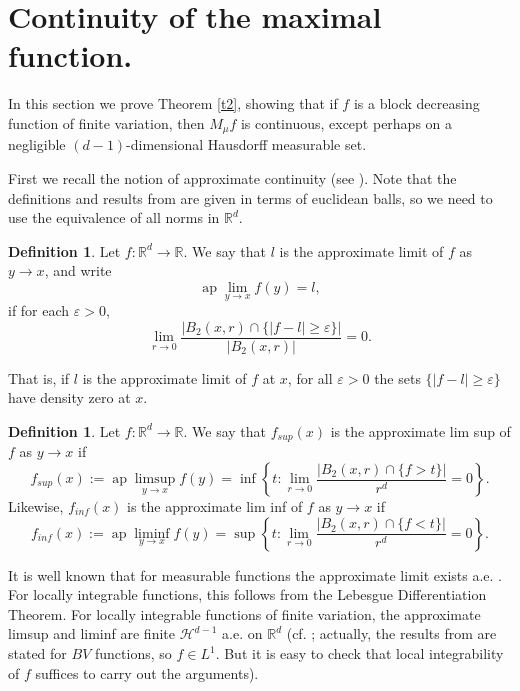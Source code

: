 \documentclass[12pt]{amsart}
\numberwithin{equation}{section}
\theoremstyle{plain}
\theoremstyle{definition}
\newtheorem{definition}[theorem]{Definition}
\theoremstyle{remark}
\begin{document}
\section{Continuity of the maximal function.}

In this section we prove Theorem \ref{t2},
showing that if $f$ is a
 block decreasing function of  finite variation, then
 $M_\mu f$ is continuous, except perhaps on a negligible $(d-1)$-dimensional
Hausdorff measurable set.

First we recall the notion of
approximate continuity (see \cite[p. 47 and 209]{EvGa}). Note that
the definitions and results from \cite{EvGa} are given in terms
of euclidean balls, so we need to use
 the equivalence of all norms in $\mathbb{R}^d$.

\begin{definition}
  Let $f:\mathbb{R}^d\rightarrow \mathbb{R}$. We say that $l$ is the
  approximate limit of $f$ as $y\to x$, and write
  \begin{equation*}
    \operatorname{ap}\lim_{y\to x}f(y)=l,
  \end{equation*}
  if for each $\varepsilon >0$,
  \begin{equation*}
    \lim_{r\to 0}\frac{|B_2(x,r)\cap\{|f-l|\ge
    \varepsilon\}|}{|B_2(x,r)|}=0.
  \end{equation*}
\end{definition}
That is, if $l$ is the approximate limit of $f$ at $x$, for all
$\varepsilon >0$ the sets $\{|f-l|\ge
    \varepsilon\}$ have density zero at $x$.

\begin{definition}\label{fsup}
  Let $f:\mathbb{R}^d\rightarrow \mathbb{R}$. We say that $f_{sup}(x)$ is the
  approximate lim sup of $f$ as $y\to x$ if
  \begin{equation*}
    f_{sup}(x):=\operatorname{ap} \limsup_{y\to x}f(y)=\inf
    \left\{t : \lim_{r\to 0}\frac{|B_2(x,r)\cap\{f>t\}|}{r^d}=0\right\}.
  \end{equation*}
Likewise,  $f_{inf}(x)$ is the
  approximate lim inf of $f$ as $y\to x$ if
  \begin{equation*}
    f_{inf}(x):=\operatorname{ap} \liminf_{y\to x}f(y)=\sup
    \left\{t : \lim_{r\to 0}\frac{|B_2(x,r)\cap\{f<t\}|}{r^d}=0\right\}.
  \end{equation*}
\end{definition}

It is well known that for measurable functions
the approximate limit exists a.e.
\cite[Theorem 3, p.47]{EvGa}. For locally integrable functions, this follows
from the Lebesgue Differentiation Theorem. For locally integrable
functions of finite variation,  the approximate limsup and
liminf are finite $\mathcal{H}^{d-1}$ a.e. on $\mathbb{R}^d$ (cf.
\cite[Theorem 2, p.211]{EvGa}; actually, the results
from \cite{EvGa} are stated
for $BV$ functions, so $f\in L^1$. But it is easy to check that
local integrability of $f$ suffices to carry out the arguments).
\end{document}
